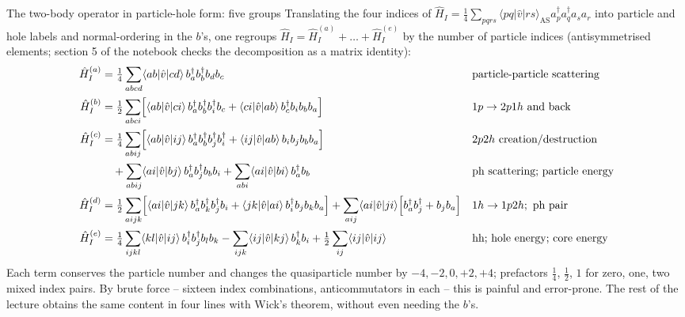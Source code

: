 \documentclass[aspectratio=169,10pt]{beamer}
\newcommand{\element}[3]{\langle #1\vert #2\vert #3\rangle}
\begin{document}
\begin{frame}{The two-body operator in particle-hole form: five groups}
  \footnotesize
  Translating the four indices of $\hat{H}_I=\frac14\sum_{pqrs}\element{pq}{\hat{v}}{rs}_{\mathrm{AS}}a_p^{\dagger}a_q^{\dagger}a_sa_r$ into particle and hole labels and normal-ordering in the $b$'s, one regroups $\hat{H}_I=\hat{H}_I^{(a)}+\dots+\hat{H}_I^{(e)}$ by the number of particle indices (antisymmetrised elements; section 5 of the notebook checks the decomposition as a matrix identity):
  \vspace{-0.4em}
  {\scriptsize
  \begin{align*}
    \hat{H}_I^{(a)}&=\tfrac14\sum_{abcd}\element{ab}{\hat{v}}{cd}\,b_a^{\dagger}b_b^{\dagger}b_db_c
    &&\text{particle-particle scattering}\\[1pt]
    \hat{H}_I^{(b)}&=\tfrac12\sum_{abci}\Bigl[\element{ab}{\hat{v}}{ci}\,b_a^{\dagger}b_b^{\dagger}b_i^{\dagger}b_c
    +\element{ci}{\hat{v}}{ab}\,b_c^{\dagger}b_ib_bb_a\Bigr]
    &&1p\to2p1h\text{ and back}\\[1pt]
    \hat{H}_I^{(c)}&=\tfrac14\sum_{abij}\Bigl[\element{ab}{\hat{v}}{ij}\,b_a^{\dagger}b_b^{\dagger}b_j^{\dagger}b_i^{\dagger}
    +\element{ij}{\hat{v}}{ab}\,b_ib_jb_bb_a\Bigr]
    &&2p2h\text{ creation/destruction}\\
    &\quad+\sum_{abij}\element{ai}{\hat{v}}{bj}\,b_a^{\dagger}b_j^{\dagger}b_bb_i
    +\sum_{abi}\element{ai}{\hat{v}}{bi}\,b_a^{\dagger}b_b
    &&\text{ph scattering; particle energy}\\[1pt]
    \hat{H}_I^{(d)}&=\tfrac12\sum_{aijk}\Bigl[\element{ai}{\hat{v}}{jk}\,b_a^{\dagger}b_k^{\dagger}b_j^{\dagger}b_i
    +\element{jk}{\hat{v}}{ai}\,b_i^{\dagger}b_jb_kb_a\Bigr]
    +\sum_{aij}\element{ai}{\hat{v}}{ji}\Bigl[b_a^{\dagger}b_j^{\dagger}+b_jb_a\Bigr]
    &&1h\to1p2h;\ \text{ph pair}\\[1pt]
    \hat{H}_I^{(e)}&=\tfrac14\sum_{ijkl}\element{kl}{\hat{v}}{ij}\,b_i^{\dagger}b_j^{\dagger}b_lb_k
    -\sum_{ijk}\element{ij}{\hat{v}}{kj}\,b_k^{\dagger}b_i
    +\tfrac12\sum_{ij}\element{ij}{\hat{v}}{ij}
    &&\text{hh; hole energy; core energy}
  \end{align*}}
  Each term conserves the particle number and changes the quasiparticle number by $-4,-2,0,+2,+4$; prefactors $\frac14$, $\frac12$, $1$ for zero, one, two mixed index pairs. By brute force -- sixteen index combinations, anticommutators in each -- this is painful and error-prone. The rest of the lecture obtains the same content in four lines with Wick's theorem, without even needing the $b$'s.
\end{frame}
\end{document}
